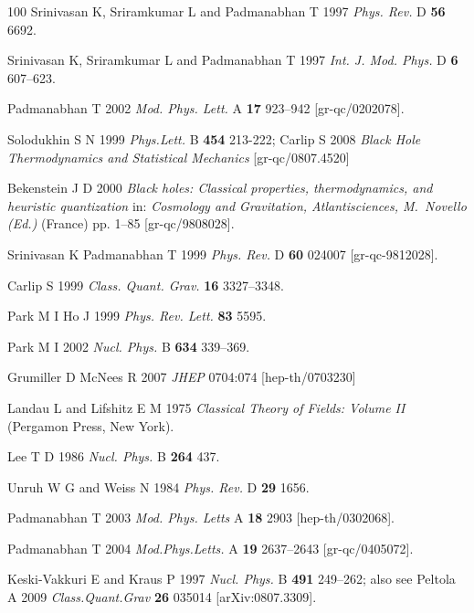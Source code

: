 \documentclass[12pt]{iopart}
\begin{document}
\begin{thebibliography}{100}
Srinivasan K, Sriramkumar L and  Padmanabhan T  1997 \textit{Phys. Rev.} D \textbf{56} 6692.

 Srinivasan K, Sriramkumar L and  Padmanabhan T 1997 \textit{Int. J. Mod. Phys.} D \textbf{6} 607--623.

Padmanabhan T 2002 \textit{Mod. Phys. Lett.} A \textbf{17} 923--942 [gr-qc/0202078].

Solodukhin S N  1999 \textit{Phys.Lett.} B \textbf{454}  213-222;
Carlip S 2008  \textit{Black Hole Thermodynamics and Statistical Mechanics}                        [gr-qc/0807.4520]

Bekenstein J D 2000 \textit{Black holes: Classical properties, thermodynamics, and
  heuristic quantization} in:  \textit{Cosmology and Gravitation,
  Atlantisciences, M.~Novello (Ed.)} (France) pp. 1--85 [gr-qc/9808028].

Srinivasan K Padmanabhan T  1999 \textit{Phys. Rev.} D \textbf{60}  024007 [gr-qc-9812028].

Carlip S 1999 \textit{Class.  Quant. Grav.} \textbf{16}  3327--3348.

Park M I  Ho J 1999 \textit{Phys. Rev. Lett.} \textbf{83}  5595.

Park M I  2002  \textit{Nucl. Phys.} B \textbf{634} 339--369.

 Grumiller D  McNees R 2007 \textit{JHEP} 0704:074
[hep-th/0703230]
 
Landau L and Lifshitz E M  1975 \textit{Classical Theory of Fields: Volume II} (Pergamon
  Press, New York).

Lee T D 1986 \textit{ Nucl. Phys.} B \textbf{264}  437.

Unruh W G  and Weiss N  1984 \textit{Phys. Rev.} D \textbf{29}  1656.


Padmanabhan T 2003 \textit{Mod. Phys. Letts} A \textbf{18} 2903  [hep-th/0302068]. 

Padmanabhan T 2004  \textit{Mod.Phys.Letts.} A \textbf{19}  2637--2643  [gr-qc/0405072].

Keski-Vakkuri E and Kraus P  1997 \textit{Nucl.  Phys.} B \textbf{491} 249--262;
also see Peltola A 2009 \textit{Class.Quant.Grav} \textbf{26} 035014 [arXiv:0807.3309].



\end{thebibliography}
\end{document}

